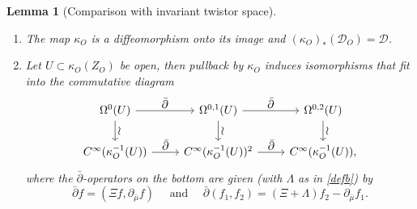 \documentclass[JEP,XML,SOM,Unicode,published]{cedram}
\let\ts\textstyle
\theoremstyle{plain}
\newtheorem{lemma}[theorem]{Lemma}
\theoremstyle{definition}
\newcommand{\D}{\mathscr{D}}
\newcommand{\1}{{\bf 1}}
\begin{document}
\skpt
\begin{lemma}[Comparison with invariant twistor space] \label{lemcoo2}
\begin{enumerate}
\item \label{coo4} The map $\kappa_O$ is a diffeomorphism onto its image and $(\kappa_O)_*(\D_O)=\D$.
\item \label{coo5} Let $U\subset \kappa_O(Z_O)$ be open, then pullback by $\kappa_O$ induces isomorphisms that fit into the commutative diagram
\begin{equation}\label{diagram}
\begin{tikzcd}
\Omega^0(U) \arrow{d}{\ts\wr} \arrow{r}{\ts\bar \partial} & \Omega^{0,1}(U) \arrow{d}{\ts\wr} \arrow{r}{\ts\bar \partial} & \Omega^{0,2}(U)\arrow{d}{\ts\wr}\\
C^\infty(\kappa_O^{-1}(U)) \arrow{r}{\ts\bar \partial}& C^\infty(\kappa_O^{-1}(U))^2 \arrow{r}{\ts\bar \partial} & C^\infty(\kappa_O^{-1}(U)),
\end{tikzcd}
\end{equation}
where the $\bar \partial$-operators on the bottom are given (with $\Lambda$ as in \eqref{defb}) by
\begin{equation*}
\bar \partial f = (\Xi f, \partial_{\bar \mu} f)\quad \text{ and } \quad \bar \partial (f_1,f_2) = (\Xi + \Lambda) f_2 - \partial_{\bar \mu} f_1.
\end{equation*}
\end{enumerate}
\end{lemma}
\end{document}
